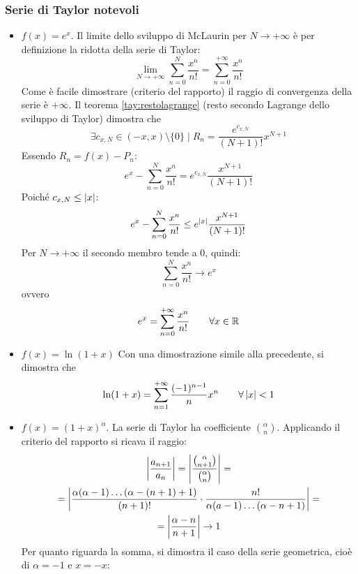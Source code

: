 \subsubsection{Serie di Taylor notevoli}
\begin{itemize}
	\item $f(x)=e^x$. Il limite dello sviluppo di McLaurin per $N\to+\infty$ è per definizione la ridotta della serie di Taylor:
	      \[
		      \lim_{N\to+\infty}\sum_{n=0}^N\frac{x^n}{n!}=\sum_{n=0}^{+\infty}\frac{x^n}{n!}
	      \]
	      Come è facile dimostrare (criterio del rapporto) il raggio di convergenza della serie è $+\infty$. Il teorema \vref{tay:restolagrange} (resto secondo Lagrange dello sviluppo di Taylor) dimostra che
	      \[
		      \exists c_{x,N}\in(-x,x)\setminus\{0\}\mid R_n=\frac{e^{c_{x,N}}}{(N+1)!}x^{N+1}
	      \]
	      Essendo $R_n=f(x)-P_n$:
	      \[
		      e^x-\sum_{n=0}^N\frac{x^n}{n!}=e^{c_{x,N}}\frac{x^{N+1}}{(N+1)!}
	      \]
	      Poiché $c_{x,N}\leq \left\lvert x \right\rvert$:
	      \[
		      e^x-\sum_{n=0}^N\frac{x^n}{n!}\leq e^{\left\lvert x \right\rvert}\frac{x^{N+1}}{(N+1)!}
	      \]
	      Per $N\to+\infty$ il secondo membro tende a $0$, quindi:
	      \[
		      \sum_{n=0}^N\frac{x^n}{n!}\to e^x
	      \]
	      ovvero
	      \begin{equation}
		      e^x=\sum_{n=0}^{+\infty}\frac{x^n}{n!}\qquad\forall x\in\mathbb{R}
	      \end{equation}
	\item $f(x)=\ln(1+x)$ Con una dimostrazione simile alla precedente, si dimostra che
	      \begin{equation}
		      \ln(1+x)=\sum_{n=1}^{+\infty}\frac{(-1)^{n-1}}{n}x^n\qquad\forall \left\lvert x \right\rvert<1
	      \end{equation}
	\item $f(x)=(1+x)^\alpha$. La serie di Taylor ha coefficiente $\binom{\alpha}{n}$. Applicando il criterio del rapporto si ricava il raggio:
	      \begin{gather*}
		      \left\lvert \frac{a_{n+1}}{a_n} \right\rvert=\left\lvert \frac{\binom{\alpha}{n+1}}{\binom{\alpha}{n}} \right\rvert=\\
		      =\left\lvert \frac{\alpha(\alpha-1)\dots(\alpha-(n+1)+1)}{(n+1)!}\cdot\frac{n!}{\alpha(a-1)\dots(\alpha-n+1)} \right\rvert=\\
		      =\left\lvert \frac{\alpha-n}{n+1} \right\rvert\to1
	      \end{gather*}
	      Per quanto riguarda la somma, si dimostra il caso della serie geometrica, cioè di $\alpha=-1$ e $x=-x$:
	      \begin{gather*}

\end{gather*}
\end{itemize}
